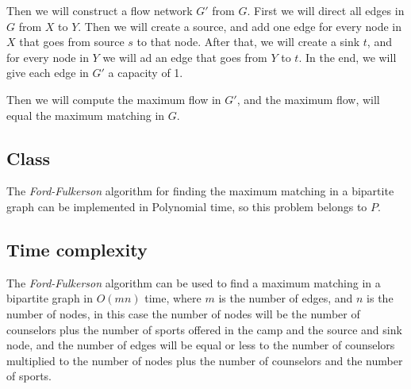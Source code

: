 \documentclass{article}
\begin{document}
Then we will construct a flow network $G'$ from $G$. First we will direct all edges in $G$ from $X$ to $Y$. Then we will create a source, and add one edge for every node in $X$ that goes from source $s$ to that node. After that, we will create a sink $t$, and for every node in $Y$ we will ad an edge that goes from $Y$ to $t$. In the end, we will give each edge in $G'$ a capacity of 1.

Then we will compute the maximum flow in $G'$, and the maximum flow, will equal the maximum matching in $G$.

\subsection*{Class}

The \textit{Ford-Fulkerson} algorithm for finding the maximum matching in a bipartite graph can be implemented in Polynomial time, so this problem belongs to $P$.

\subsection*{Time complexity}

The \textit{Ford-Fulkerson} algorithm can be used to find a maximum matching in a bipartite graph in $O(mn)$ time, where $m$ is the number of edges, and $n$ is the number of nodes, in this case the number of nodes will be the number of counselors plus the number of sports offered in the camp and the source and sink node, and the number of edges will be equal or less to the number of counselors multiplied to the number of nodes plus the number of counselors and the number of sports.
\end{document}
